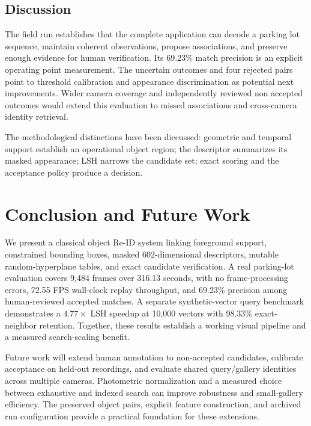 \documentclass[conference]{IEEEtran}
\begin{document}
\subsection{Discussion}
The field run establishes that the complete application can decode a parking lot sequence, maintain coherent observations, propose associations, and preserve enough evidence for human verification. Its 69.23\% match precision is an explicit operating point measurement.
The uncertain outcomes and four rejected pairs point to threshold calibration and appearance discrimination as potential next improvements. Wider camera coverage and independently reviewed non accepted outcomes would extend this evaluation to missed associations and cross-camera identity retrieval.

The methodological distinctions have been diccussed: geometric and temporal support establish an operational object region; the descriptor summarizes its masked appearance; LSH narrows the candidate set; exact scoring and the acceptance policy produce a decision. 

\section{Conclusion and Future Work}
We present a classical object Re-ID system linking foreground support, constrained bounding boxes, masked 602-dimensional descriptors, mutable random-hyperplane tables, and exact candidate verification. A real parking-lot evaluation covers 9,484 frames over 316.13 seconds, with no frame-processing errors, 72.55 FPS wall-clock replay throughput, and 69.23\% precision among human-reviewed accepted matches. A separate synthetic-vector query benchmark demonstrates a $4.77\times$ LSH speedup at 10,000 vectors with 98.33\% exact-neighbor retention. Together, these results establish a working visual pipeline and a measured search-scaling benefit.

Future work will extend human annotation to non-accepted candidates, calibrate acceptance on held-out recordings, and evaluate shared query/gallery identities across multiple cameras. Photometric normalization and a measured choice between exhaustive and indexed search can improve robustness and small-gallery efficiency. The preserved object pairs, explicit feature construction, and archived run configuration provide a practical foundation for these extensions.
\end{document}
